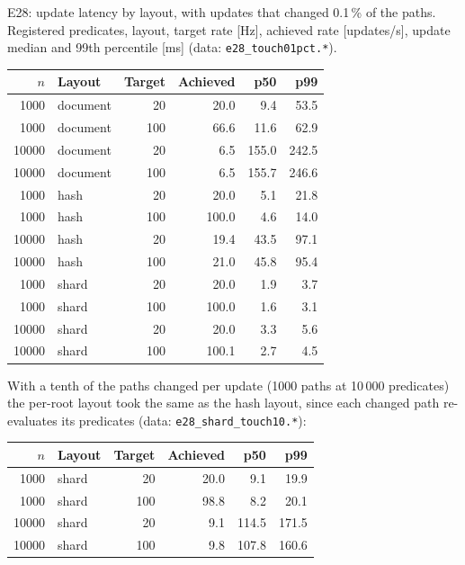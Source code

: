 \documentclass[11pt]{article}
\begin{document}
E28: update latency by layout, with updates that changed 0.1\,\% of the paths. Registered predicates, layout, target rate [Hz], achieved rate [updates/s], update median and 99th percentile [ms] (data: \texttt{e28\_touch01pct.*}).
\begin{center}
\footnotesize
\begin{tabular}{@{}rlrrrr@{}}
\toprule
$n$ & \textbf{Layout} & \textbf{Target} & \textbf{Achieved} & \textbf{p50} & \textbf{p99} \\
\midrule
1000 & document & 20 & 20.0 & 9.4 & 53.5 \\
1000 & document & 100 & 66.6 & 11.6 & 62.9 \\
10000 & document & 20 & 6.5 & 155.0 & 242.5 \\
10000 & document & 100 & 6.5 & 155.7 & 246.6 \\
1000 & hash & 20 & 20.0 & 5.1 & 21.8 \\
1000 & hash & 100 & 100.0 & 4.6 & 14.0 \\
10000 & hash & 20 & 19.4 & 43.5 & 97.1 \\
10000 & hash & 100 & 21.0 & 45.8 & 95.4 \\
1000 & shard & 20 & 20.0 & 1.9 & 3.7 \\
1000 & shard & 100 & 100.0 & 1.6 & 3.1 \\
10000 & shard & 20 & 20.0 & 3.3 & 5.6 \\
10000 & shard & 100 & 100.1 & 2.7 & 4.5 \\
\bottomrule
\end{tabular}
\end{center}

With a tenth of the paths changed per update (1000 paths at 10\,000 predicates) the per-root layout took the same as the hash layout, since each changed path re-evaluates its predicates (data: \texttt{e28\_shard\_touch10.*}):
\begin{center}
\footnotesize
\begin{tabular}{@{}rlrrrr@{}}
\toprule
$n$ & \textbf{Layout} & \textbf{Target} & \textbf{Achieved} & \textbf{p50} & \textbf{p99} \\
\midrule
1000 & shard & 20 & 20.0 & 9.1 & 19.9 \\
1000 & shard & 100 & 98.8 & 8.2 & 20.1 \\
10000 & shard & 20 & 9.1 & 114.5 & 171.5 \\
10000 & shard & 100 & 9.8 & 107.8 & 160.6 \\
\bottomrule
\end{tabular}
\end{center}
\end{document}
